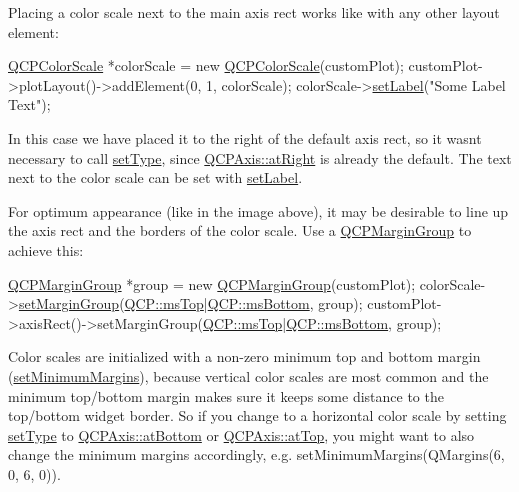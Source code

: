 Placing a color scale next to the main axis rect works like with any other layout element\+: 
\begin{DoxyCode}
\hyperlink{class_q_c_p_color_scale}{QCPColorScale} *colorScale = \textcolor{keyword}{new} \hyperlink{class_q_c_p_color_scale_aa8debce1be38b54287c04d4f584394b4}{QCPColorScale}(customPlot);
customPlot->plotLayout()->addElement(0, 1, colorScale);
colorScale->\hyperlink{class_q_c_p_color_scale_aee124ae8396320cacf8276e9a0fbb8ce}{setLabel}(\textcolor{stringliteral}{"Some Label Text"});
\end{DoxyCode}
 In this case we have placed it to the right of the default axis rect, so it wasn\textquotesingle{}t necessary to call \hyperlink{class_q_c_p_color_scale_a1bf9bdb291927c422dd66b404b206f1f}{set\+Type}, since \hyperlink{class_q_c_p_axis_ae2bcc1728b382f10f064612b368bc18aadf5509f7d29199ef2f263b1dd224b345}{Q\+C\+P\+Axis\+::at\+Right} is already the default. The text next to the color scale can be set with \hyperlink{class_q_c_p_color_scale_aee124ae8396320cacf8276e9a0fbb8ce}{set\+Label}.

For optimum appearance (like in the image above), it may be desirable to line up the axis rect and the borders of the color scale. Use a \hyperlink{class_q_c_p_margin_group}{Q\+C\+P\+Margin\+Group} to achieve this\+: 
\begin{DoxyCode}
\hyperlink{class_q_c_p_margin_group}{QCPMarginGroup} *group = \textcolor{keyword}{new} \hyperlink{class_q_c_p_margin_group}{QCPMarginGroup}(customPlot);
colorScale->\hyperlink{class_q_c_p_layout_element_a516e56f76b6bc100e8e71d329866847d}{setMarginGroup}(\hyperlink{namespace_q_c_p_a7e487e3e2ccb62ab7771065bab7cae54a5db8fb0d0b0ecf0d611c2602a348e8a0}{QCP::msTop}|\hyperlink{namespace_q_c_p_a7e487e3e2ccb62ab7771065bab7cae54a5241d8eac2bab9524a38889f576179cc}{QCP::msBottom}, group);
customPlot->axisRect()->setMarginGroup(\hyperlink{namespace_q_c_p_a7e487e3e2ccb62ab7771065bab7cae54a5db8fb0d0b0ecf0d611c2602a348e8a0}{QCP::msTop}|\hyperlink{namespace_q_c_p_a7e487e3e2ccb62ab7771065bab7cae54a5241d8eac2bab9524a38889f576179cc}{QCP::msBottom}, group);
\end{DoxyCode}


Color scales are initialized with a non-\/zero minimum top and bottom margin (\hyperlink{class_q_c_p_layout_element_a0a8a17abc16b7923159fcc7608f94673}{set\+Minimum\+Margins}), because vertical color scales are most common and the minimum top/bottom margin makes sure it keeps some distance to the top/bottom widget border. So if you change to a horizontal color scale by setting \hyperlink{class_q_c_p_color_scale_a1bf9bdb291927c422dd66b404b206f1f}{set\+Type} to \hyperlink{class_q_c_p_axis_ae2bcc1728b382f10f064612b368bc18aa220d68888516b6c3b493d144f1ba438f}{Q\+C\+P\+Axis\+::at\+Bottom} or \hyperlink{class_q_c_p_axis_ae2bcc1728b382f10f064612b368bc18aac0ece2b680d3f545e701f75af1655977}{Q\+C\+P\+Axis\+::at\+Top}, you might want to also change the minimum margins accordingly, e.\+g. {\ttfamily set\+Minimum\+Margins(\+Q\+Margins(6, 0, 6, 0))}. 

